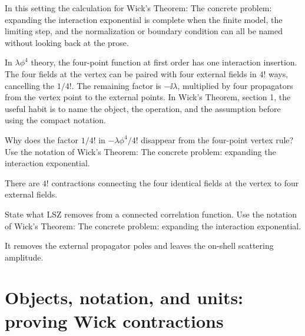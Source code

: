 In this setting the calculation for Wick's Theorem: The concrete problem: expanding the interaction exponential is complete when the finite model, the limiting step, and the normalization or boundary condition can all be named without looking back at the prose.




\begin{example}
In \(\lambda\phi^4\) theory, the four-point function at first order has one interaction insertion.  The four fields at the vertex can be paired with four external fields in \(4!\) ways, cancelling the \(1/4!\).  The remaining factor is \(-\ii\lambda\), multiplied by four propagators from the vertex point to the external points.  In Wick's Theorem, section 1, the useful habit is to name the object, the operation, and the assumption before using the compact notation.
\end{example}



\begin{exercise}
Why does the factor \(1/4!\) in \(-\lambda\phi^4/4!\) disappear from the four-point vertex rule?  Use the notation of Wick's Theorem: The concrete problem: expanding the interaction exponential.
\begin{answer}
There are \(4!\) contractions connecting the four identical fields at the vertex to four external fields.
\end{answer}
\end{exercise}

\begin{exercise}
State what LSZ removes from a connected correlation function.  Use the notation of Wick's Theorem: The concrete problem: expanding the interaction exponential.
\begin{answer}
It removes the external propagator poles and leaves the on-shell scattering amplitude.
\end{answer}
\end{exercise}



\section{Objects, notation, and units: proving Wick contractions}














